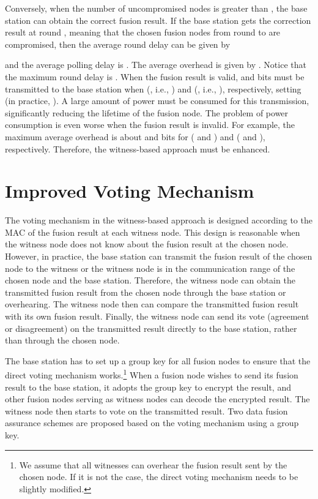 \documentclass[12pt, onecolumn, draftcls]{IEEEtran}
\begin{document}
Conversely, when the number of uncompromised nodes is greater than
, the base station can obtain the correct fusion result. If the
base station gets the correction result at round , meaning that
the chosen fusion nodes from round  to  are compromised,
then the average round delay can be given by

and the average polling delay is . The average overhead is
given by . Notice that the maximum round delay is .
When the fusion result is valid,  and  bits must be
transmitted to the base station when  (, i.e., ) and  (, i.e., ),
respectively, setting  (in practice, ). A large amount of
power must be consumed for this transmission, significantly reducing
the lifetime of the fusion node. The problem of power consumption is
even worse when the fusion result is invalid. For example, the
maximum average overhead is about  and  bits for 
( and ) and  ( and ), respectively.
Therefore, the witness-based approach must be enhanced.

\section{Improved Voting Mechanism}
\label{sec:voting} The voting mechanism in the witness-based
approach is designed according to the MAC of the fusion result at
each witness node. This design is reasonable when the witness node
does not know about the fusion result at the chosen node. However,
in practice, the base station can transmit the fusion result of the
chosen node to the witness or the witness node is in the
communication range of the chosen node and the base station.
Therefore, the witness node can obtain the transmitted fusion result
from the chosen node through the base station or overhearing. The
witness node then can compare the transmitted fusion result with its
own fusion result. Finally, the witness node can send its vote
(agreement or disagreement) on the transmitted result directly to
the base station, rather than through the chosen node.

The base station has to set up a group key for all fusion nodes to
ensure that the direct voting mechanism works.\footnote{We assume
that all witnesses can overhear the fusion result sent by the chosen
node. If it is not the case, the direct voting mechanism needs to be
slightly modified.}  When a fusion node wishes to send its fusion
result to the base station, it adopts the group key to encrypt the
result, and other fusion nodes serving as witness nodes can decode
the encrypted result. The witness node then starts to vote on the
transmitted result. Two data fusion assurance schemes are proposed
based on the voting mechanism using a group key.
\end{document}
